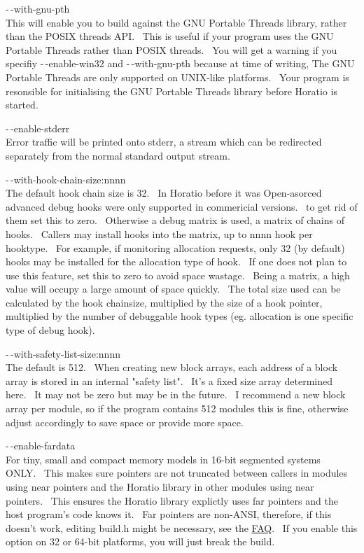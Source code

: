 \documentclass{article}
\begin{document}
\par -$\,$-with-gnu-pth\\
This will enable you to build against the GNU Portable Threads library,
rather than the POSIX threads API.~ This is useful if your program
uses the GNU Portable Threads rather than POSIX threads.~ You will
get a warning if you specifiy -$\,$-enable-win32 and -$\,$-with-gnu-pth because
at time of writing, The GNU Portable Threads are only supported on
UNIX-like platforms.~ Your program is resonsible for initialising
the GNU Portable Threads library before Horatio is started.\\

\par -$\,$-enable-stderr
\\
Error traffic will be printed onto stderr, a stream which can be
redirected separately from the normal standard output stream.\\

\par -$\,$-with-hook-chain-size:nnnn
\\
The default hook chain size is 32.~ In Horatio before it was
Open-asorced advanced debug hooks were only supported in commericial
versions.~
to get rid of them set this to zero.~ Otherwise a debug matrix is
used, a matrix of chains of hooks.~ Callers may install hooks into
the matrix, up to nnnn hook per hooktype.~ For example, if
monitoring
allocation requests, only 32 (by default) hooks may be installed for
the
allocation type of hook.~ If one does not plan to use this
feature,
set this to zero to avoid space wastage.~ Being a matrix, a high
value will occupy a large amount of space quickly.~ The total size
used can be calculated by the hook chainsize, multiplied by the size of
a hook pointer, multiplied by the number of debuggable hook types (eg.
allocation is one specific type of debug hook).\\

\par -$\,$-with-safety-list-size:nnnn
\\
The default is 512.~ When creating new block arrays, each address
of a block array is stored in an internal "safety list".~ It's a
fixed
size array determined here.~ It may not be zero but may be in the
future.~ I recommend a new block array per module, so if the
program
contains 512 modules this is fine, otherwise adjust accordingly to save
space or provide more space.

\par -$\,$-enable-fardata
\\
For tiny, small and compact memory models in 16-bit segmented systems
ONLY.~ This makes sure pointers are not truncated between callers
in modules using near pointers and the Horatio library in other
modules
using near pointers.~ This ensures the Horatio library explictly
uses far pointers and the host program's code knows it.~ Far
pointers are non-ANSI, therefore, if this doesn't work,
editing build.h might be necessary, see the \href{#FAQ}{FAQ}.~
If you enable this option on 32 or 64-bit platforms, you will just
break the build.\\
\end{document}
